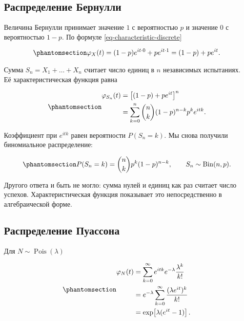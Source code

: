 \documentclass[
  russian,
  11pt,
  a4paper,
  open=any]{scrbook}
\begin{document}
\subsection{Распределение
Бернулли}\label{ux440ux430ux441ux43fux440ux435ux434ux435ux43bux435ux43dux438ux435-ux431ux435ux440ux43dux443ux43bux43bux438}

Величина Бернулли принимает значение \(1\) с вероятностью \(p\) и
значение \(0\) с вероятностью \(1-p\). По формуле
\ref{eq-characteristic-discrete}

\begin{equation}\protect\phantomsection\label{eq-bernoulli-characteristic}{
\varphi_X(t)
=(1-p)e^{it\cdot0}+pe^{it\cdot1}
=(1-p)+pe^{it}.
}\end{equation}

Сумма \(S_n=X_1+\dots+X_n\) считает число единиц в \(n\) независимых
испытаниях. Её характеристическая функция равна

\begin{equation}\protect\phantomsection\label{eq-binomial-from-characteristic}{
\begin{aligned}
\varphi_{S_n}(t)
&=\left[(1-p)+pe^{it}\right]^n\\
&=\sum_{k=0}^{n}
\binom{n}{k}(1-p)^{n-k}p^k e^{itk}.
\end{aligned}
}\end{equation}

Коэффициент при \(e^{itk}\) равен вероятности \(P(S_n=k)\). Мы снова
получили биномиальное распределение:

\begin{equation}\protect\phantomsection\label{eq-binomial-distribution-from-bernoulli}{
P(S_n=k)=\binom{n}{k}p^k(1-p)^{n-k},
\qquad
S_n\sim\operatorname{Bin}(n,p).
}\end{equation}

Другого ответа и быть не могло: сумма нулей и единиц как раз считает
число успехов. Характеристическая функция показывает это непосредственно
в алгебраической форме.

\subsection{Распределение
Пуассона}\label{ux440ux430ux441ux43fux440ux435ux434ux435ux43bux435ux43dux438ux435-ux43fux443ux430ux441ux441ux43eux43dux430}

Для \(N\sim\operatorname{Pois}(\lambda)\)

\begin{equation}\protect\phantomsection\label{eq-poisson-characteristic}{
\begin{aligned}
\varphi_N(t)
&=\sum_{k=0}^{\infty}
e^{itk}e^{-\lambda}\frac{\lambda^k}{k!}\\
&=e^{-\lambda}
\sum_{k=0}^{\infty}\frac{(\lambda e^{it})^k}{k!}\\
&=\exp\!\left[\lambda(e^{it}-1)\right].
\end{aligned}
}\end{equation}
\end{document}
